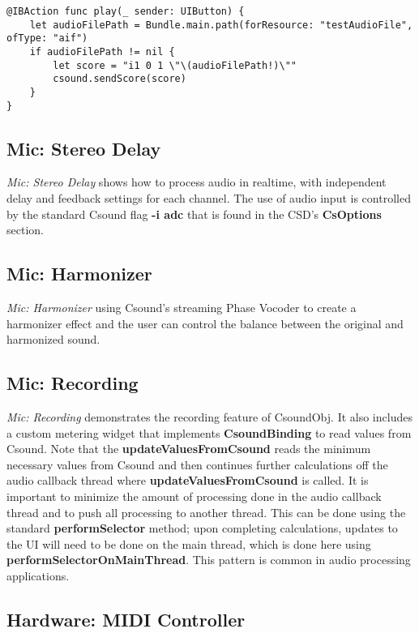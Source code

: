 \documentclass[11pt]{article}
\begin{document}
\begin{lstlisting}[caption=Play button Swift 3 callback code]
@IBAction func play(_ sender: UIButton) {
    let audioFilePath = Bundle.main.path(forResource: "testAudioFile", ofType: "aif")
    if audioFilePath != nil {
        let score = "i1 0 1 \"\(audioFilePath!)\""
        csound.sendScore(score)
    }
}
\end{lstlisting}

\subsection{Mic: Stereo Delay}

\emph{Mic: Stereo Delay} shows how to process audio in realtime, with independent delay and feedback settings for each channel. The use of audio input is controlled by the standard Csound flag \textbf{-i adc} that is found in the CSD's \textbf{CsOptions} section.

\subsection{Mic: Harmonizer}

\emph{Mic: Harmonizer} using Csound's streaming Phase Vocoder to create a harmonizer effect and the user can control the balance between the original and harmonized sound.

\subsection{Mic: Recording}

\emph{Mic: Recording} demonstrates the recording feature of CsoundObj.  It also includes a custom metering widget that implements \textbf{CsoundBinding} to read values from Csound.  Note that the \textbf{updateValuesFromCsound} reads the minimum necessary values from Csound and then continues further calculations off the audio callback thread where \textbf{updateValuesFromCsound} is called.  It is important to minimize the amount of processing done in the audio callback thread and to push all processing to another thread.  This can be done using the standard \textbf{performSelector} method; upon completing calculations, updates to the UI will need to be done on the main thread, which is done here using \textbf{performSelectorOnMainThread}.  This pattern is common in audio processing applications.

\subsection{Hardware: MIDI Controller}
\end{document}
